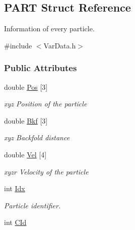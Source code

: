 \hypertarget{structPART}{}\subsection{P\+A\+RT Struct Reference}
\label{structPART}


Information of every particle.  




{\ttfamily \#include $<$Var\+Data.\+h$>$}

\subsubsection*{Public Attributes}
\begin{DoxyCompactItemize}
\item 
double \hyperlink{structPART_a863738e46f14b3bfc674ad87d35f143d}{Pos} \mbox{[}3\mbox{]}\hypertarget{structPART_a863738e46f14b3bfc674ad87d35f143d}{}\label{structPART_a863738e46f14b3bfc674ad87d35f143d}

\begin{DoxyCompactList}\small\item\em xyz Position of the particle \end{DoxyCompactList}\item 
double \hyperlink{structPART_a77abbc20fd99f1fb464e7a922e543e19}{Bkf} \mbox{[}3\mbox{]}\hypertarget{structPART_a77abbc20fd99f1fb464e7a922e543e19}{}\label{structPART_a77abbc20fd99f1fb464e7a922e543e19}

\begin{DoxyCompactList}\small\item\em xyz Backfold distance \end{DoxyCompactList}\item 
double \hyperlink{structPART_afd1b3747170c238c06ba3420cbc5c2a2}{Vel} \mbox{[}4\mbox{]}\hypertarget{structPART_afd1b3747170c238c06ba3420cbc5c2a2}{}\label{structPART_afd1b3747170c238c06ba3420cbc5c2a2}

\begin{DoxyCompactList}\small\item\em xyzr Velocity of the particle \end{DoxyCompactList}\item 
int \hyperlink{structPART_a26c51826a2d187b6baa0f5f249436abe}{Idx}\hypertarget{structPART_a26c51826a2d187b6baa0f5f249436abe}{}\label{structPART_a26c51826a2d187b6baa0f5f249436abe}

\begin{DoxyCompactList}\small\item\em Particle identifier. \end{DoxyCompactList}\item 
int \hyperlink{structPART_ae9c6df97c72d6a4af74acf24adbe81bf}{C\+Id}\hypertarget{structPART_ae9c6df97c72d6a4af74acf24adbe81bf}{}\label{structPART_ae9c6df97c72d6a4af74acf24adbe81bf}


\end{DoxyCompactItemize}
